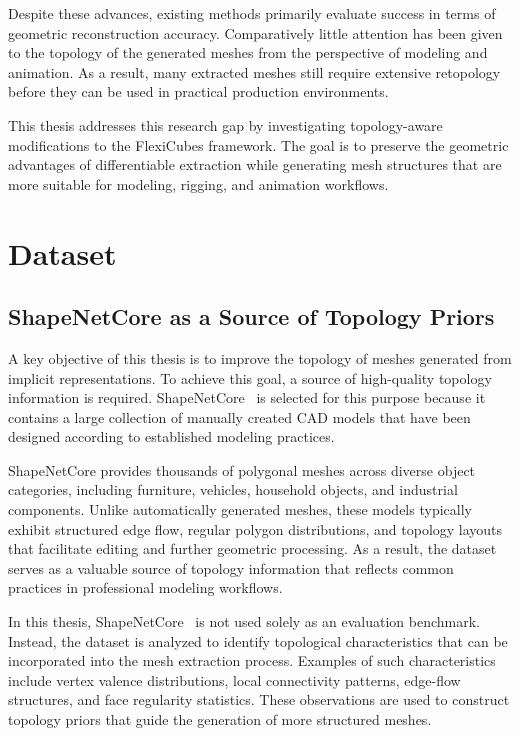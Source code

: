 \documentclass[../main.tex]{subfiles}
\begin{document}
Despite these advances, existing methods primarily evaluate success in terms of geometric reconstruction accuracy. Comparatively little attention has been given to the topology of the generated meshes from the perspective of modeling and animation. As a result, many extracted meshes still require extensive retopology before they can be used in practical production environments.

This thesis addresses this research gap by investigating topology-aware modifications to the FlexiCubes framework. The goal is to preserve the geometric advantages of differentiable extraction while generating mesh structures that are more suitable for modeling, rigging, and animation workflows.

\section{Dataset}

\subsection{ShapeNetCore as a Source of Topology Priors}

A key objective of this thesis is to improve the topology of meshes generated from implicit representations. To achieve this goal, a source of high-quality topology information is required. ShapeNetCore~\cite{shapenet2015} is selected for this purpose because it contains a large collection of manually created CAD models that have been designed according to established modeling practices.

ShapeNetCore provides thousands of polygonal meshes across diverse object categories, including furniture, vehicles, household objects, and industrial components. Unlike automatically generated meshes, these models typically exhibit structured edge flow, regular polygon distributions, and topology layouts that facilitate editing and further geometric processing. As a result, the dataset serves as a valuable source of topology information that reflects common practices in professional modeling workflows.

In this thesis, ShapeNetCore~\cite{shapenet2015} is not used solely as an evaluation benchmark. Instead, the dataset is analyzed to identify topological characteristics that can be incorporated into the mesh extraction process. Examples of such characteristics include vertex valence distributions, local connectivity patterns, edge-flow structures, and face regularity statistics. These observations are used to construct topology priors that guide the generation of more structured meshes.
\end{document}

